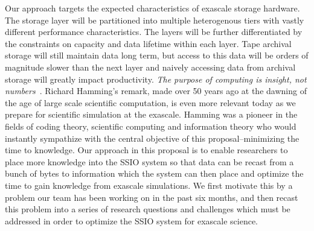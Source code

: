 Our approach targets the expected characteristics of exascale storage
hardware. The storage layer will be partitioned into multiple heterogenous
tiers with vastly different performance characteristics. The layers
will be further differentiated by the constraints on capacity
and data lifetime within each layer. Tape archival storage will still maintain
data long term, but access to this data will be orders of magnitude slower
than the next layer and naively accessing data from archival storage will
greatly impact productivity.
%
{\em The purpose of computing is insight, not numbers}~\cite{Hamming:book}.
Richard Hamming's remark, made over 50 years ago at the dawning of the age of
large scale scientific computation, is even more relevant today as we prepare
for scientific simulation at the exascale. Hamming was a pioneer in the fields
of coding theory, scientific computing and information theory who would
instantly sympathize with the central objective of this proposal--minimizing
the time to knowledge.  Our approach in this proposal is to enable researchers
to place more knowledge into the SSIO system so that data can be recast from a bunch of bytes
to information which the system can then place and optimize the time to gain knowledge from exascale simulations.
We first motivate this by a problem our team has been working on in the past six months, and then recast this problem into
a series of research questions and challenges which must be addressed in order to optimize the SSIO system for exascale science.



